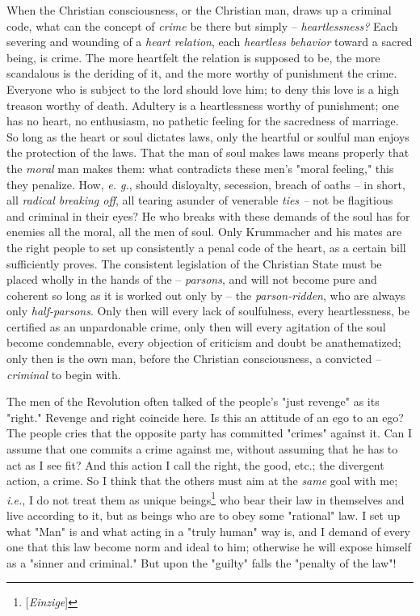 \documentclass[a4paper]{book}
\begin{document}
When the Christian consciousness, or the Christian man, draws up a criminal 
code, what can the concept of \textit{crime} be there but simply -- 
\textit{heartlessness?} Each severing and wounding of a \textit{heart 
relation}, each \textit{heartless behavior} toward a sacred being, is crime. 
The more heartfelt the relation is supposed to be, the more scandalous is the 
deriding of it, and the more worthy of punishment the crime. Everyone who is 
subject to the lord should love him; to deny this love is a high treason 
worthy of death. Adultery is a heartlessness worthy of punishment; one has no 
heart, no enthusiasm, no pathetic feeling for the sacredness of marriage. So 
long as the heart or soul dictates laws, only the heartful or soulful man 
enjoys the protection of the laws. That the man of soul makes laws means 
properly that the \textit{moral} man makes them: what contradicts these men's 
"{}moral feeling,"{} this they penalize. How, \textit{e. g.}, should 
disloyalty, secession, breach of oaths -- in short, all \textit{radical 
breaking off}, all tearing asunder of venerable \textit{ties --} not be 
flagitious and criminal in their eyes? He who breaks with these demands of the 
soul has for enemies all the moral, all the men of soul. Only Krummacher and 
his mates are the right people to set up consistently a penal code of the 
heart, as a certain bill sufficiently proves. The consistent legislation of 
the Christian State must be placed wholly in the hands of the -- 
\textit{parsons}, and will not become pure and coherent so long as it is 
worked out only by -- the \textit{parson-ridden}, who are always only 
\textit{half-parsons}. Only then will every lack of soulfulness, every 
heartlessness, be certified as an unpardonable crime, only then will every 
agitation of the soul become condemnable, every objection of criticism and 
doubt be anathematized; only then is the own man, before the Christian 
consciousness, a convicted -- \textit{criminal} to begin with.

The men of the Revolution often talked of the people's "{}just revenge"{} as 
its "{}right."{} Revenge and right coincide here. Is this an attitude of an 
ego to an ego? The people cries that the opposite party has committed 
"{}crimes"{} against it. Can I assume that one commits a crime against me, 
without assuming that he has to act as I see fit? And this action I call the 
right, the good, etc.; the divergent action, a crime. So I think that the 
others must aim at the \textit{same} goal with me; \textit{i.e.}, I do not 
treat them as unique beings\footnote{[\textit{Einzige}]} who bear their law in 
themselves and live according to it, but as beings who are to obey some 
"{}rational"{} law. I set up what "{}Man"{} is and what acting in a "{}truly 
human"{} way is, and I demand of every one that this law become norm and ideal 
to him; otherwise he will expose himself as a "{}sinner and criminal."{} But 
upon the "{}guilty"{} falls the "{}penalty of the law"{}!
\end{document}
